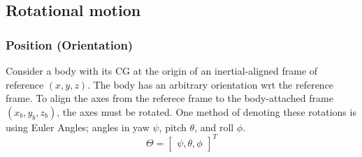 \documentclass[a4paper,12pt]{article}
\begin{document}
\subsection{Rotational motion}
\subsubsection{Position (Orientation)}
Consider a body with its CG at the origin of an inertial-aligned frame of reference \((x, y, z)\). The body has an arbitrary orientation wrt the reference frame.
To align the axes from the referece frame to the body-attached frame \((x_b, y_b, z_b)\), the axes must be rotated. One method of denoting these rotations is using Euler Angles; angles in yaw \( \psi \), pitch \( \theta \), and roll \( \phi \). 
\begin{equation} \nonumber
    \Theta = \begin{bmatrix}
        \psi, \theta, \phi
    \end{bmatrix}^T
\end{equation}
\end{document}
